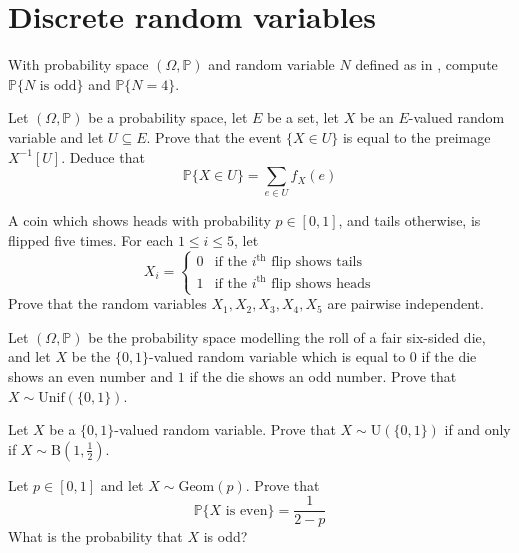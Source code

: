 \section{Discrete random variables}


\begin{exercise}
With probability space $(\Omega,\mathbb{P})$ and random variable $N$ defined as in , compute $\mathbb{P}\{N \text{ is odd}\}$ and $\mathbb{P}\{N = 4\}$.
\end{exercise}


\begin{exercise}
Let $(\Omega, \mathbb{P})$ be a probability space, let $E$ be a set, let $X$ be an $E$-valued random variable and let $U \subseteq E$. Prove that the event $\{X \in U\}$ is equal to the preimage $X^{-1}[U]$. Deduce that
\[ \mathbb{P}\{X \in U\} = \sum_{e \in U} f_X(e) \]
\end{exercise}

\begin{exercise}
A coin which shows heads with probability $p \in [0,1]$, and tails otherwise, is flipped five times. For each $1 \le i \le 5$, let
\[ X_i = \begin{cases} 0 & \text{if the } i^{\text{th}} \text{ flip shows tails} \\
1 & \text{if the } i^{\text{th}} \text{ flip shows heads} \end{cases} \]
Prove that the random variables $X_1,X_2,X_3,X_4,X_5$ are pairwise independent.
\end{exercise}


\begin{exercise}
Let $(\Omega,\mathbb{P})$ be the probability space modelling the roll of a fair six-sided die, and let $X$ be the $\{0,1\}$-valued random variable which is equal to $0$ if the die shows an even number and $1$ if the die shows an odd number. Prove that $X \sim \mathrm{Unif}(\{0,1\})$.
\end{exercise}


\begin{exercise}
Let $X$ be a $\{0,1\}$-valued random variable. Prove that $X \sim \mathrm{U}(\{0,1\})$ if and only if $X \sim \mathrm{B}(1,\frac{1}{2})$.
\end{exercise}


\begin{exercise}
Let $p \in [0,1]$ and let $X \sim \mathrm{Geom}(p)$. Prove that
\[ \mathbb{P}\{X \text{ is even}\} = \frac{1}{2-p} \]
What is the probability that $X$ is odd?
\end{exercise}


